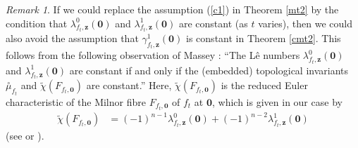 \documentclass[a4paper,fleqn,11pt]{amsart}
\theoremstyle{definition}
\theoremstyle{remark}
\newtheorem{remark}[theorem]{Remark}
\numberwithin{equation}{section}
\begin{document}
\begin{remark}\label{rac22}
If we could replace the assumption (\ref{c1}) in Theorem \ref{mt2} by the condition that $\lambda^0_{f_t,\mathbf{z}} (\mathbf{0})$ and $\lambda^1_{f_t,\mathbf{z}} (\mathbf{0})$ are constant (as $t$ varies), then we could also avoid the assumption that $\gamma^1_{f_t,\mathbf{z}} (\mathbf{0})$ is constant in Theorem \ref{cmt2}. This follows from the following observation of Massey \cite[\S 4]{M7}: ``The L\^e numbers $\lambda^0_{f_t,\mathbf{z}} (\mathbf{0})$ and $\lambda^1_{f_t,\mathbf{z}} (\mathbf{0})$ are constant if and only if the (embedded) topological invariants $\overset{\circ}{\mu}_{f_t}$ and $\tilde\chi(F_{f_t,\mathbf{0}})$ are constant.'' Here, $\tilde\chi(F_{f_t,\mathbf{0}})$ is the reduced Euler characteristic of the Milnor fibre $F_{f_t,\mathbf{0}}$ of $f_t$ at $\mathbf{0}$, which is given in our case by 
\begin{align*}
\tilde \chi(F_{f_t,\mathbf{0}}) 
& = (-1)^{n-1} \lambda^0_{f_t,\mathbf{z}}(\mathbf{0}) + (-1)^{n-2} \lambda^1_{f_t,\mathbf{z}}(\mathbf{0})
\end{align*}
(see \cite[\S 4]{M7} or \cite[Theorem 3.3]{M}).  
\end{remark}
\end{document}
